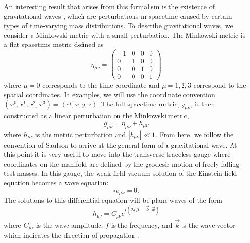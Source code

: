 An interesting result that arises from this formalism is the 
existence of gravitational waves \cite{Einstein:1916,Einstein:1918}, 
which are perturbations in 
spacetime caused by certain types of time-varying mass distributions. 
To describe gravitational waves, we consider 
a Minkowski metric with a small perturbation. The Minkowski metric 
is a flat spacetime metric defined as
\begin{equation}
\eta_{\mu\nu} = 
  \begin{pmatrix}
   -1 & 0 & 0 & 0 \\
    0 & 1 & 0 & 0 \\
    0 & 0 & 1 & 0 \\
    0 & 0 & 0 & 1
  \end{pmatrix}
\end{equation}
where $\mu = 0$ corresponds to the time coordinate and $\mu = {1,2,3}$ 
correspond to the spatial coordinates. In examples, we will use the coordinate 
convention $(x^0,x^1,x^2,x^3) = (ct,x,y,z)$. 
The full spacetime metric, $g_{\mu\nu}$, is then constructed as a 
linear perturbation on the Minkowski metric,
\begin{equation}
g_{\mu\nu} = \eta_{\mu\nu} + h_{\mu\nu}
\end{equation}
where $h_{\mu\nu}$ is the metric perturbation and $|h_{\mu\nu}| \ll 1$.
From here, we follow the convention of Saulson \cite{Saulson:1994} to arrive at the general 
form of a gravitational wave.
At this point it is very useful to move into the transverse traceless 
gauge where coordinates on the manifold are defined by the geodesic 
motion of freely-falling test masses. In this gauge, the weak field 
vacuum solution of the Einstein field equation becomes a wave equation: 
\begin{equation}
\square h_{\mu\nu} = 0.
\end{equation}
The solutions to this differential equation will be plane waves of 
the form
\begin{equation}
h_{\mu\nu} = C_{\mu\nu}e^{i(2\pi ft - \vec{k}\cdot\vec{x})}
\end{equation}
where $C_{\mu\nu}$ is the wave amplitude, $f$ is the frequency, 
and $\vec{k}$ is the wave vector which indicates the direction of 
propagation \cite{Carroll}.

